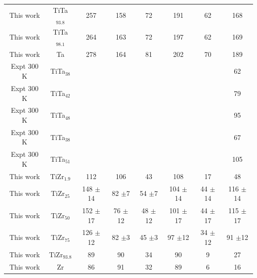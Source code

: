 \begin{longtable}[H]{ c c c c c c c c}
	This work & TiTa$_{93.8}$ & 257 & 158 & 72 & 191 & 62 & 168\\
	This work & TiTa$_{98.1}$ & 264 & 163 & 72 & 197 & 62 & 169\\
	This work & Ta & 278 & 164 & 81 & 202 & 70 & 189\\
	Expt 300 K \cite{Fedotov1985} & TiTa$_{38}$ & & & & & & 62\\
	Expt 300 K \cite{Fedotov1985} & TiTa$_{42}$ & & & & & & 79\\
	Expt 300 K \cite{Fedotov1985} & TiTa$_{48}$ & & & & & & 95\\
	Expt 300 K \cite{Zhou2004a} & TiTa$_{38}$ & & & & & & 67\\
	Expt 300 K \cite{Zhou2004a} & TiTa$_{51}$ & & & & & & 105\\
	This work & TiZr$_{1.9}$ & 112 & 106 & 43 & 108 & 17 & 48\\
	This work & TiZr$_{25}$ & 148 $\pm$14 & 82 $\pm$7 & 54 $\pm$7 & 104 $\pm$14 & 44 $\pm$14 & 116 $\pm$14\\
	This work & TiZr$_{50}$ & 152 $\pm$17 & 76 $\pm$12 & 48 $\pm$12 & 101 $\pm$17 & 44 $\pm$17 & 115 $\pm$17\\
	This work & TiZr$_{75}$ & 126 $\pm$12 & 82 $\pm$3 & 45 $\pm$3 & 97 $\pm$12 & 34 $\pm$12 & 91 $\pm$12\\
	This work & TiZr$_{93.8}$ & 89 & 90 & 34 & 90 & 9 & 27\\
	This work & Zr & 86 & 91 & 32 & 89 & 6 & 16\\
	\hline
\end{longtable}

